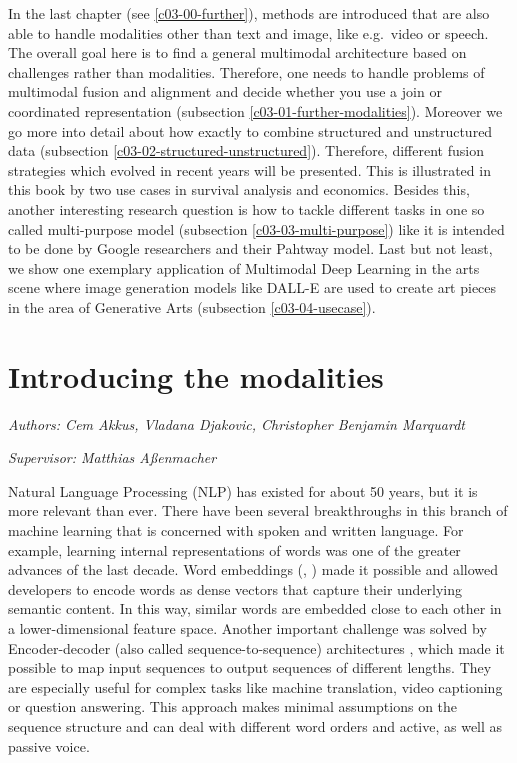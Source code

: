 \documentclass[
]{krantz}
\begin{document}
In the last chapter (see \ref{c03-00-further}), methods are introduced that are also able to handle modalities other than text and image, like e.g.~video or speech. The overall goal here is to find a general multimodal architecture based on challenges rather than modalities. Therefore, one needs to handle problems of multimodal fusion and alignment and decide whether you use a join or coordinated representation (subsection \ref{c03-01-further-modalities}). Moreover we go more into detail about how exactly to combine structured and unstructured data (subsection \ref{c03-02-structured-unstructured}). Therefore, different fusion strategies which evolved in recent years will be presented. This is illustrated in this book by two use cases in survival analysis and economics. Besides this, another interesting research question is how to tackle different tasks in one so called multi-purpose model (subsection \ref{c03-03-multi-purpose}) like it is intended to be done by Google researchers \citet{Pathways} and their Pahtway model. Last but not least, we show one exemplary application of Multimodal Deep Learning in the arts scene where image generation models like DALL-E \citep{DALLE} are used to create art pieces in the area of Generative Arts (subsection \ref{c03-04-usecase}).

\hypertarget{c01-00-intro-modalities}{%
\chapter{Introducing the modalities}\label{c01-00-intro-modalities}}

\emph{Authors: Cem Akkus, Vladana Djakovic, Christopher Benjamin Marquardt}

\emph{Supervisor: Matthias Aßenmacher}

Natural Language Processing (NLP) has existed for about 50 years, but it is more relevant than ever. There have been several breakthroughs in this branch of machine learning that is concerned with spoken and written language. For example, learning internal representations of words was one of the greater advances of the last decade. Word embeddings (\citet{Mikolov2013}, \citet{Bojanowski2016}) made it possible and allowed developers to encode words as dense vectors that capture their underlying semantic content. In this way, similar words are embedded close to each other in a lower-dimensional feature space. Another important challenge was solved by Encoder-decoder (also called sequence-to-sequence) architectures \citet{Sutskever2014}, which made it possible to map input sequences to output sequences of different lengths. They are especially useful for complex tasks like machine translation, video captioning or question answering. This approach makes minimal assumptions on the sequence structure and can deal with different word orders and active, as well as passive voice.
\end{document}
